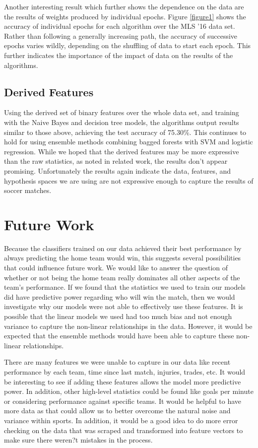Another interesting result which further shows the dependence on the data are the results of weights produced by individual epochs. Figure \ref{figure1} shows the accuracy of individual epochs for each algorithm over the MLS '16 data set. Rather than following a generally increasing path, the accuracy of successive epochs varies wildly, depending on the shuffling of data to start each epoch. This further indicates the importance of the impact of data on the results of the algorithms. 

\subsection{Derived Features}
Using the derived set of binary features over the whole data set, and training with the Naive Bayes and decision tree models, the algorithms output results similar to those above, achieving the test accuracy of 75.30\%. This continues to hold for using ensemble methods combining bagged forests with SVM and logistic regression. While we hoped that the derived features may be more expressive than the raw statistics, as noted in related work, the results don't appear promising. Unfortunately the results again indicate the data, features, and hypothesis spaces we are using are not expressive enough to capture the results of soccer matches.

\section{Future Work}
Because the classifiers trained on our data achieved their best performance by always predicting the home team would win, this suggests several possibilities that could influence future work. We would like to answer the question of whether or not being the home team really dominates all other aspects of the team's performance. If we found that the statistics we used to train our models did have predictive power regarding who will win the match, then we would investigate why our models were not able to effectively use these features. It is possible that the linear models we used had too much bias and not enough variance to capture the non-linear relationships in the data. However, it would be expected that the ensemble methods would have been able to capture these non-linear relationships.

There are many features we were unable to capture in our data like recent performance by each team, time since last match, injuries, trades, etc. It would be interesting to see if adding these features allows the model more predictive power. In addition, other high-level statistics could be found like goals per minute or considering performance against specific teams. It would be helpful to have more data as that could allow us to better overcome the natural noise and variance within sports. In addition, it would be a good idea to do more error checking on the data that was scraped and transformed into feature vectors to make sure there weren?t mistakes in the process.

